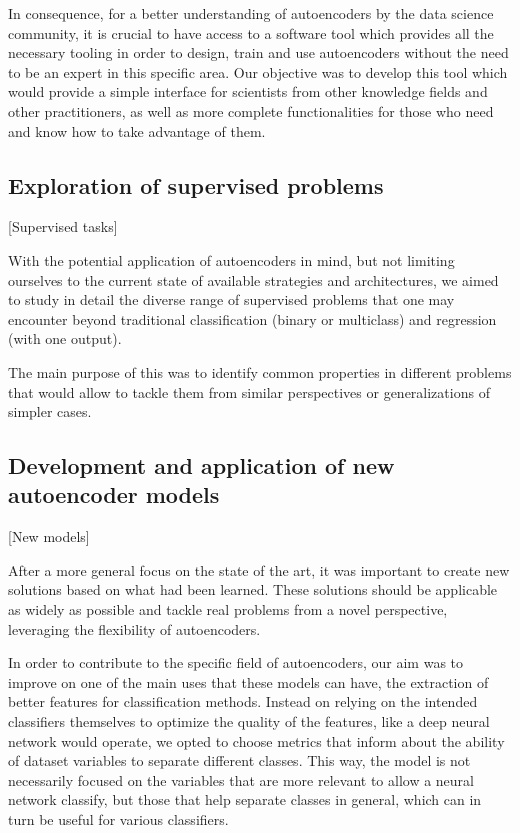 In consequence, for a better understanding of autoencoders by the data science community, it is crucial to have access to a software tool which provides all the necessary tooling in order to design, train and use autoencoders without the need to be an expert in this specific area. Our objective was to develop this tool which would provide a simple interface for scientists from other knowledge fields and other practitioners, as well as more complete functionalities for those who need and know how to take advantage of them.

\subsection{Exploration of supervised problems}[Supervised tasks]\label{ss:exploration}

With the potential application of autoencoders in mind, but not limiting ourselves to the current state of available strategies and architectures, we aimed to study in detail the diverse range of supervised problems that one may encounter beyond traditional classification (binary or multiclass) and regression (with one output).

The main purpose of this was to identify common properties in different problems that would allow to tackle them from similar perspectives or generalizations of simpler cases.

\subsection{Development and application of new autoencoder models}[New models]\label{ss:newae}

After a more general focus on the state of the art, it was important to create new solutions based on what had been learned. These solutions should be applicable as widely as possible and tackle real problems from a novel perspective, leveraging the flexibility of autoencoders.

In order to contribute to the specific field of autoencoders, our aim was to improve on one of the main uses that these models can have, the extraction of better features for classification methods. Instead on relying on the intended classifiers themselves to optimize the quality of the features, like a deep neural network would operate, we opted to choose metrics that inform about the ability of dataset variables to separate different classes. This way, the model is not necessarily focused on the variables that are more relevant to allow a neural network classify, but those that help separate classes in general, which can in turn be useful for various classifiers.

